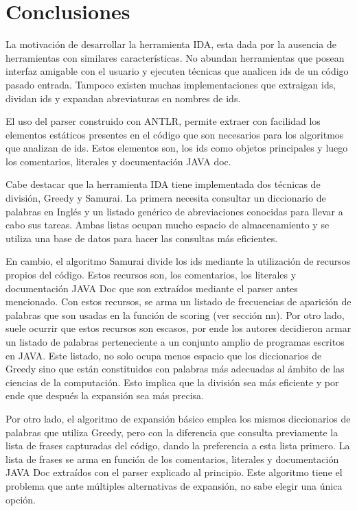 \documentclass[a4paper,12pt]{report}
\begin{document}
\chapter{Conclusiones}

La motivación de desarrollar la herramienta IDA, esta dada por la ausencia de herramientas con similares características. No abundan herramientas que posean interfaz amigable con el usuario y ejecuten técnicas que analicen ids de un código pasado entrada. Tampoco existen muchas implementaciones que extraigan ids, dividan ids y expandan abreviaturas en nombres de ids. 

El uso del parser construido con ANTLR, permite extraer con facilidad los elementos estáticos presentes en el código que son necesarios para los algoritmos que analizan de ids. Estos elementos son, los ids como objetos principales y luego los comentarios, literales y documentación JAVA doc.

Cabe destacar que la herramienta IDA tiene implementada dos técnicas de división, Greedy y Samurai. La primera necesita consultar un diccionario de palabras en Inglés y un listado genérico de abreviaciones conocidas para llevar a cabo sus tareas. Ambas listas ocupan mucho espacio de almacenamiento y se utiliza una base de datos para hacer las consultas más eficientes. 

En cambio, el algoritmo Samurai divide los ids mediante la utilización de recursos propios del código. Estos recursos son, los comentarios, los literales y documentación JAVA Doc que son extraídos mediante el parser antes mencionado. Con estos recursos, se arma un listado de frecuencias de aparición de palabras que son usadas en la función de scoring (ver sección nn). Por otro lado, suele ocurrir que estos recursos son escasos, por ende los autores decidieron armar un listado de palabras perteneciente a un conjunto amplio de programas escritos en JAVA. Este listado, no solo ocupa menos espacio que los diccionarios de Greedy sino que están constituidos con palabras más adecuadas al ámbito de las ciencias de la computación. Esto implica que la división sea más eficiente y por ende que después la expansión sea más precisa.

Por otro lado, el algoritmo de expansión básico emplea los mismos diccionarios de palabras que utiliza Greedy, pero con la diferencia que consulta previamente la lista de frases capturadas del código, dando la preferencia a esta lista primero. La lista de frases se arma en función de los comentarios, literales y documentación JAVA Doc extraídos con el parser explicado al principio. Este algoritmo tiene el problema que ante múltiples alternativas de expansión, no sabe elegir una única opción.
\end{document}
